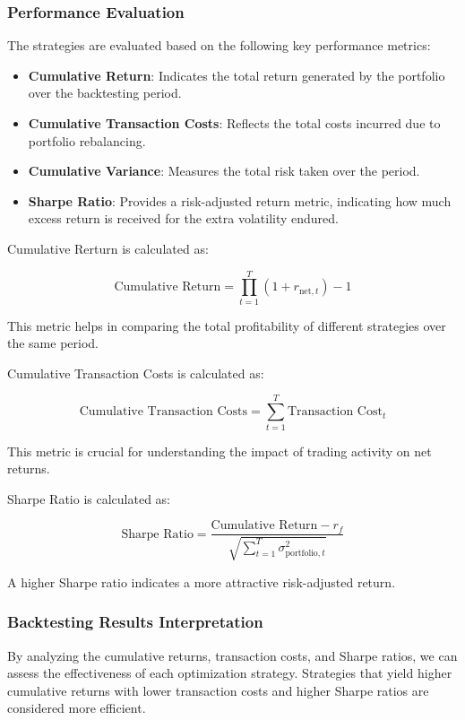 \subsubsection{Performance Evaluation}

The strategies are evaluated based on the following key performance metrics:

\begin{itemize}
    \item \textbf{Cumulative Return}: Indicates the total return generated by the portfolio over the backtesting period.
    \item \textbf{Cumulative Transaction Costs}: Reflects the total costs incurred due to portfolio rebalancing.
    \item \textbf{Cumulative Variance}: Measures the total risk taken over the period.
    \item \textbf{Sharpe Ratio}: Provides a risk-adjusted return metric, indicating how much excess return is received for the extra volatility endured.
\end{itemize}


Cumulative Rerturn is calculated as:

\[
\text{Cumulative Return} = \prod_{t=1}^T (1 + r_{\text{net}, t}) - 1
\]

This metric helps in comparing the total profitability of different strategies over the same period.

Cumulative Transaction Costs is calculated as:

\[
\text{Cumulative Transaction Costs} = \sum_{t=1}^T \text{Transaction Cost}_t
\]

This metric is crucial for understanding the impact of trading activity on net returns.

Sharpe Ratio is calculated as:

\[
\text{Sharpe Ratio} = \frac{\text{Cumulative Return} - r_f}{\sqrt{\sum_{t=1}^T \sigma_{\text{portfolio}, t}^2}}
\]

A higher Sharpe ratio indicates a more attractive risk-adjusted return.

\subsubsection{Backtesting Results Interpretation}

By analyzing the cumulative returns, transaction costs, and Sharpe ratios, we can assess the effectiveness of each optimization strategy. Strategies that yield higher cumulative returns with lower transaction costs and higher Sharpe ratios are considered more efficient.

